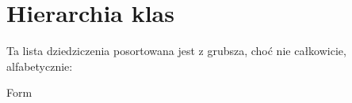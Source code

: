 \section{Hierarchia klas}
Ta lista dziedziczenia posortowana jest z grubsza, choć nie całkowicie, alfabetycznie\+:\begin{DoxyCompactList}
\item Form\begin{DoxyCompactList}
\item {}
\end{DoxyCompactList}
\end{DoxyCompactList}
